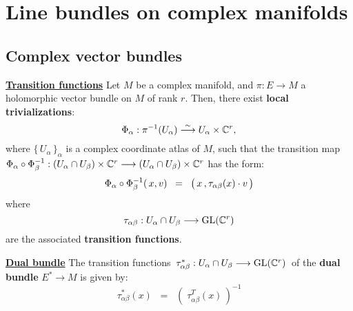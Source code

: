 

\section{Line bundles on complex manifolds}
\setcounter{theorem}{0}
\setcounter{equation}{0}


\renewcommand{\theenumi}{\roman{enumi}}
\renewcommand{\labelenumi}{\textnormal{(\theenumi)}$\;\;$}


\subsection{Complex vector bundles}

\noindent
\underline{\textbf{Transition functions}}
\vskip 0.1cm
\noindent
Let $M$ be a complex manifold, and $\pi : E \longrightarrow M$ a holomorphic vector bundle on $M$ of rank $r$.
Then, there exist \textbf{local trivializations}:
\begin{equation*}
\Phi_{\alpha} : \pi^{-1}(U_{\alpha}) \overset{\sim}{\longrightarrow} U_{\alpha} \times \mathbb{C}^{r},
\end{equation*}
where $\{\,U_{\alpha}\,\}_{\alpha}$ is a complex coordinate atlas of $M$,
such that the transition map
$\Phi_{\alpha} \circ \Phi_{\beta}^{-1} : (U_{\alpha} \cap U_{\beta}) \times \mathbb{C}^{r} \longrightarrow (U_{\alpha} \cap U_{\beta}) \times \mathbb{C}^{r}$
has the form:
\begin{equation*}
\Phi_{\alpha} \circ \Phi_{\beta}^{-1}\!\left(\,x,v\right)
\;\; = \;\;
	\left(\, x \overset{{\color{white}-}}{,} \tau_{\alpha\beta}(x) \cdot v\,\right)
\end{equation*}
where
\begin{equation*}
\tau_{\alpha\beta} : U_{\alpha} \cap U_{\beta} \longrightarrow \textnormal{GL}(\mathbb{C}^{r})
\end{equation*}
are the associated \textbf{transition functions}.

\vskip0.75cm
\noindent
\underline{\textbf{Dual bundle}}
\vskip 0.1cm
\noindent
The transition functions
\,$\tau^{*}_{\alpha\beta} : U_{\alpha} \cap U_{\beta} \longrightarrow \textnormal{GL}(\mathbb{C}^{r})$\,
of the \textbf{dual bundle} $E^{*} \longrightarrow M$ is given by:
\begin{equation*}
\tau^{*}_{\alpha\beta}(x)
\;\; = \;\;
	\left(\;\tau^{T}_{\alpha\beta}(x)\,\right)^{-1}
\end{equation*}


